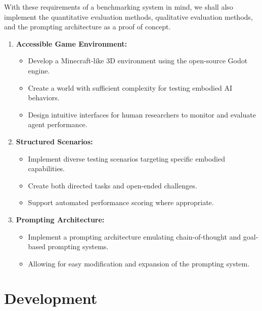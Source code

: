 \documentclass{article}
\begin{document}
With these requirements of a benchmarking system in mind, we shall also implement the quantitative evaluation methods, qualitative evaluation methods, and the prompting architecture as a proof of concept.
\begin{enumerate}
    \item \textbf{Accessible Game Environment:}
        \begin{itemize}
            \item Develop a Minecraft-like 3D environment using the open-source Godot engine.
            \item Create a world with sufficient complexity for testing embodied AI behaviors.
            \item Design intuitive interfaces for human researchers to monitor and evaluate agent performance.
        \end{itemize}
    \item \textbf{Structured Scenarios:}
        \begin{itemize}
            \item Implement diverse testing scenarios targeting specific embodied capabilities.
            \item Create both directed tasks and open-ended challenges.
            \item Support automated performance scoring where appropriate.
        \end{itemize}
    \item \textbf{Prompting Architecture:}
        \begin{itemize}
            \item Implement a prompting architecture emulating chain-of-thought and goal-based prompting systems.
            \item Allowing for easy modification and expansion of the prompting system.
        \end{itemize}
\end{enumerate}

\section{Development}
\end{document}
